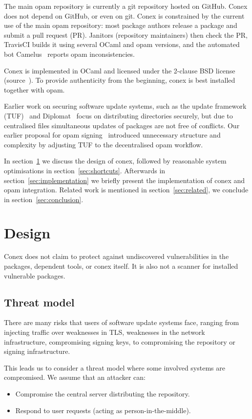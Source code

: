 \documentclass[nocopyrightspace]{sigplanconf}
\begin{document}
The main opam repository is currently a git repository hosted on GitHub.
Conex does not depend on GitHub, or even on git.
Conex is constrained by the current use of the main opam repository:  most package authors release a package and submit a pull request (PR).
Janitors (repository maintainers) then check the PR, TravisCI builds it using several OCaml and opam versions, and the automated bot Camelus~\cite{camelus} reports opam inconsistencies.

Conex is implemented in OCaml and licensed under the 2-clause BSD license (source~\cite{conex}).
To provide authenticity from the beginning, conex is best installed together with opam.

Earlier work on securing software update systems, such as the update framework (TUF)~\cite{tuf} and Diplomat~\cite{diplomat} focus on distributing directories securely, but due to centralised files simultaneous updates of packages are not free of conflicts.
Our earlier proposal for opam signing~\cite{opamsigning} introduced unnecessary structure and complexity by adjusting TUF to the decentralised opam workflow.

In section~\ref{sec:design} we discuss the design of conex, followed by reasonable system optimisations in section~\ref{sec:shortcuts}.
Afterwards in section~\ref{sec:implementation} we briefly present the implementation of conex and opam integration.
Related work is mentioned in section~\ref{sec:related}, we conclude in section~\ref{sec:conclusion}.

\section{Design} \label{sec:design}
Conex does not claim to protect against undiscovered vulnerabilities in the packages, dependent tools, or conex itself.
It is also not a scanner for installed vulnerable packages.

\subsection{Threat model}
There are many risks that users of software update systems face, ranging from injecting traffic over weaknesses in TLS, weaknesses in the network infrastructure, compromising signing keys, to compromising the repository or signing infrastructure.

This leads us to consider a threat model where some involved systems are compromised.  We assume that an attacker can:
\begin{itemize}
  \item Compromise the central server distributing the repository.
  \item Respond to user requests (acting as person-in-the-middle).
\end{itemize}
\end{document}
